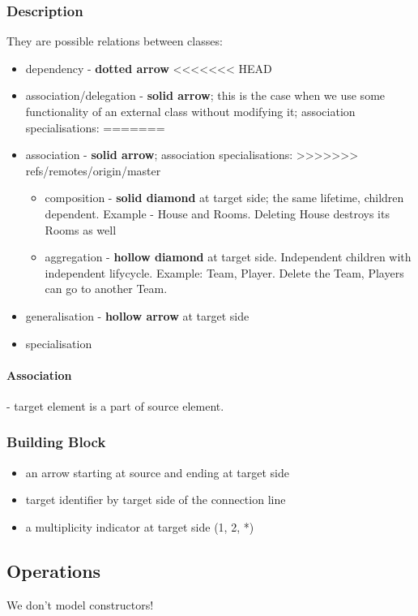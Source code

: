 \documentclass{report}
\begin{document}
\subsubsection{Description} 
They are possible relations between classes:
\begin{itemize}
	\item dependency - \textbf{dotted arrow}
<<<<<<< HEAD
	\item association/delegation - \textbf{solid arrow}; 
	this is the case when we use some functionality of an external class
	without modifying it; association specialisations:
=======
	\item association - \textbf{solid arrow}; association specialisations:
>>>>>>> refs/remotes/origin/master
	\begin{itemize}
		\item composition - \textbf{solid diamond} at target side; the same lifetime, 
		children dependent. Example - House and Rooms. Deleting House destroys its
		Rooms as well
		\item aggregation - \textbf{hollow diamond} at target side. Independent children
		with independent lifycycle. Example: Team, Player. Delete the Team, Players can go
		to another Team.
	\end{itemize}
	\item generalisation - \textbf{hollow arrow} at target side
	\item specialisation
\end{itemize}

\paragraph{Association} - target element is a part of source element.

\subsubsection{Building Block}
\begin{itemize}
  \item an arrow starting at source and ending at target side
  \item target identifier by target side of the connection line
  \item a multiplicity indicator at target side (1, 2, *)
\end{itemize}

\subsection{Operations}
We don't model constructors!
\end{document}
